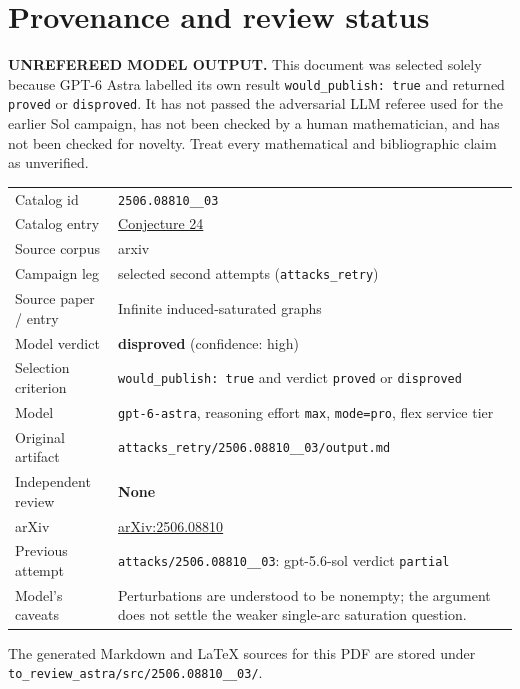 \documentclass[
  11pt,
  a4paper,
]{article}
\newcounter{none} %
\begin{document}
\appendix

\section{Provenance and review
status}\label{provenance-and-review-status}

\begin{warning}

\textbf{UNREFEREED MODEL OUTPUT.} This document was selected solely
because GPT-6 Astra labelled its own result
\texttt{would\_publish:\ true} and returned \texttt{proved} or
\texttt{disproved}. It has not passed the adversarial LLM referee used
for the earlier Sol campaign, has not been checked by a human
mathematician, and has not been checked for novelty. Treat every
mathematical and bibliographic claim as unverified.

\end{warning}

{\def\LTcaptype{none} %
\begin{longtable}[]{@{}
  >{\raggedright\arraybackslash}p{}
  >{\raggedright\arraybackslash}p{}@{}}
\toprule\noalign{}
\endhead
\bottomrule\noalign{}
\endlastfoot
Catalog id & \texttt{2506.08810\_\_03} \\
Catalog entry &
\href{https://graph-theory-ai.github.io/graph-conjectures/arxiv/2506.08810__03/}{Conjecture
24} \\
Source corpus & arxiv \\
Campaign leg & selected second attempts (\texttt{attacks\_retry}) \\
Source paper / entry & Infinite induced-saturated graphs \\
Model verdict & \textbf{disproved} (confidence: high) \\
Selection criterion & \texttt{would\_publish:\ true} and verdict
\texttt{proved} or \texttt{disproved} \\
Model & \texttt{gpt-6-astra}, reasoning effort \texttt{max},
\texttt{mode=pro}, flex service tier \\
Original artifact &
\texttt{attacks\_retry/2506.08810\_\_03/output.md} \\
Independent review & \textbf{None} \\
arXiv & \href{https://arxiv.org/abs/2506.08810}{arXiv:2506.08810} \\
Previous attempt & \texttt{attacks/2506.08810\_\_03}: gpt-5.6-sol
verdict \texttt{partial} \\
Model's caveats & Perturbations are understood to be nonempty; the
argument does not settle the weaker single-arc saturation question. \\
\end{longtable}
}

The generated Markdown and LaTeX sources for this PDF are stored under
\texttt{to\_review\_astra/src/2506.08810\_\_03/}.
\end{document}
